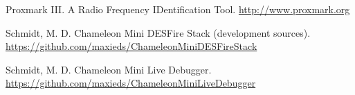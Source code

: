 \documentclass[usenames,svgnames,dvipsnames,11pt]{beamer}
\begin{document}
\begin{frame}[t,allowframebreaks]
\begin{thebibliography}{10}
Proxmark III. A Radio Frequency IDentification Tool. 
\url{http://www.proxmark.org}

Schmidt, M. D. 
Chameleon Mini DESFire Stack (development sources). 
\url{https://github.com/maxieds/ChameleonMiniDESFireStack}

Schmidt, M. D. 
Chameleon Mini Live Debugger. 
\url{https://github.com/maxieds/ChameleonMiniLiveDebugger}

\end{thebibliography}

\end{frame} 

\end{document}
